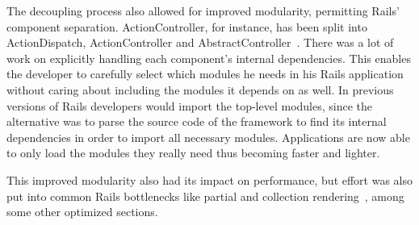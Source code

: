 The decoupling process also allowed for improved modularity, permitting Rails' component separation. ActionController, for instance, has been split into ActionDispatch, ActionController and AbstractController~\cite{vaporware_to_awesome}. There was a lot of work on explicitly handling each component's internal dependencies. This enables the developer to carefully select which modules he needs in his Rails application without caring about including the modules it depends on as well. In previous versions of Rails developers would import the top-level modules, since the alternative was to parse the source code of the framework to find its internal dependencies in order to import all necessary modules. Applications are now able to only load the modules they really need thus becoming faster and lighter.

This improved modularity also had its impact on performance, but effort was also put into common Rails bottlenecks like partial and collection rendering~\cite{vaporware_to_awesome}, among some other optimized sections.

